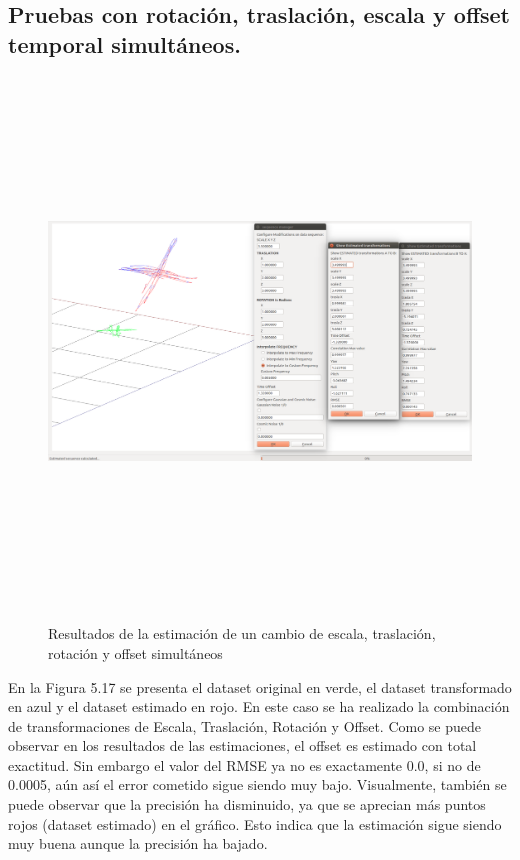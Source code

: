 \subsection{Pruebas con rotación, traslación, escala y offset temporal simultáneos.}
\begin{figure}[H]
\begin{center}
\label{fig:opciones de View}\includegraphics[height=14.0cm,width=18.0cm]{img/cap6/Escala_Trasla_Rota_Offset_abba.png}
\hspace{0.5cm}

\end{center}

\caption{Resultados de la estimación de un cambio de escala, traslación, rotación y offset simultáneos}
\end{figure}

En la Figura 5.17 se presenta el dataset original en verde, el dataset transformado en azul y el dataset estimado en rojo.
En este caso se ha realizado la combinación de transformaciones de Escala, Traslación, Rotación y Offset.
Como se puede observar en los resultados de las estimaciones, el offset es estimado con total exactitud. Sin embargo el valor del RMSE ya no es exactamente 0.0, si no de 0.0005, aún así el error cometido sigue siendo muy bajo.
Visualmente, también se puede observar que la precisión ha disminuido, ya que se aprecian más puntos rojos (dataset estimado) en el gráfico. Esto indica que la estimación sigue siendo muy buena aunque la precisión ha bajado.



